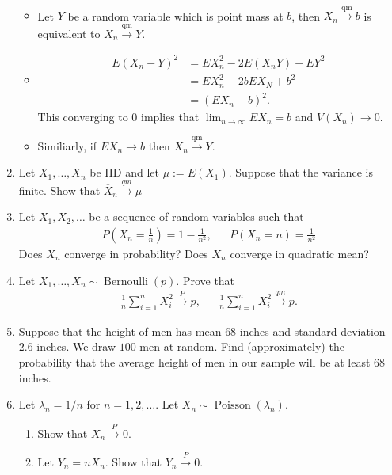 \documentclass{article}
\begin{document}
\begin{enumerate}
$$\begin{aligned}
	\end{aligned}
	$$
		\begin{itemize}
			\item Let $Y$ be a random variable which is point mass at $b$, then $X_n \overset{\operatorname{qm}}{\longrightarrow} b$ is equivalent to $X_n \overset{\operatorname{qm}}{\longrightarrow} Y$.
			\item
			$$
			\begin{aligned}
			E(X_n - Y)^2 &= EX_n^2 - 2E(X_nY) + EY^2 \\
			&= EX_n^2 - 2b EX_N + b^2 \\
			&= (EX_n - b)^2.
			\end{aligned}
			$$
			This converging to $0$ implies that $\lim_{n \rightarrow \infty} EX_n = b$ and $V(X_n) \rightarrow 0$.
			\item Similiarly, if $EX_n \rightarrow b$ then $X_n \overset{\operatorname{qm}}{\rightarrow} Y$.
		\end{itemize}
	\item Let $X_1, \dots, X_n$ be IID and let $\mu := E(X_1)$. Suppose that the variance is finite. Show that $\overline{X}_n \overset{qm}{\longrightarrow} \mu$
	\item Let $X_1, X_2, \dots$ be a sequence of random variables such that
	$$
	\begin{aligned}
	P\left(X_n = \frac{1}{n}\right) = 1 - \frac{1}{n^2},&& P(X_n = n) = \frac{1}{n^2}
	\end{aligned}
	$$
	Does $X_n$ converge in probability? Does $X_n$ converge in quadratic mean?
	\item Let $X_1, \dots, X_n \sim \operatorname{Bernoulli}(p)$. Prove that
	$$
	\begin{aligned}
	\frac{1}{n} \sum_{i = 1}^n X_i^2 \overset{P}{\longrightarrow} p,&& \frac{1}{n}\sum_{i = 1}^n X_i^2 \overset{qm}{\longrightarrow} p.
	\end{aligned}
	$$
	\item Suppose that the height of men has mean $68$ inches and standard deviation $2.6$ inches. We draw $100$ men at random. Find (approximately) the probability that the average height of men in our sample will be at least $68$ inches.
	\item Let $\lambda_n = 1 / n$ for $n = 1, 2, \dots$. Let $X_n \sim \operatorname{Poisson}(\lambda_n)$.
		\begin{enumerate}
			\item Show that $X_n \overset{P}{\longrightarrow} 0$.
			\item Let $Y_n = nX_n$. Show that $Y_n \overset{P}{\longrightarrow} 0$.

\end{enumerate}
\end{enumerate}
\end{document}

